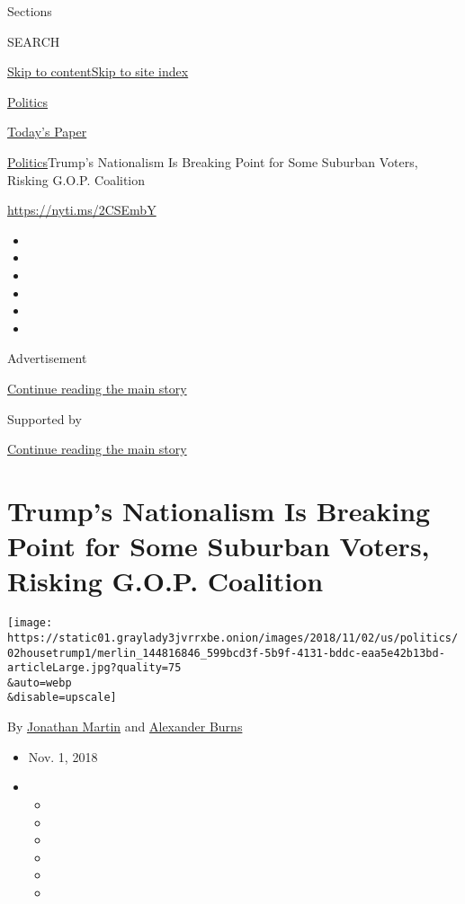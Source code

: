 Sections

SEARCH

\protect\hyperlink{site-content}{Skip to
content}\protect\hyperlink{site-index}{Skip to site index}

\href{https://www.nytimes3xbfgragh.onion/section/politics}{Politics}

\href{https://myaccount.nytimes3xbfgragh.onion/auth/login?response_type=cookie\&client_id=vi}{}

\href{https://www.nytimes3xbfgragh.onion/section/todayspaper}{Today's
Paper}

\href{/section/politics}{Politics}\textbar{}Trump's Nationalism Is
Breaking Point for Some Suburban Voters, Risking G.O.P. Coalition

\url{https://nyti.ms/2CSEmbY}

\begin{itemize}
\item
\item
\item
\item
\item
\item
\end{itemize}

Advertisement

\protect\hyperlink{after-top}{Continue reading the main story}

Supported by

\protect\hyperlink{after-sponsor}{Continue reading the main story}

\hypertarget{trumps-nationalism-is-breaking-point-for-some-suburban-voters-risking-gop-coalition}{%
\section{Trump's Nationalism Is Breaking Point for Some Suburban Voters,
Risking G.O.P.
Coalition}\label{trumps-nationalism-is-breaking-point-for-some-suburban-voters-risking-gop-coalition}}

\texttt{[image: https://static01.graylady3jvrrxbe.onion/images/2018/11/02/us/politics/02housetrump1/merlin\_144816846\_599bcd3f-5b9f-4131-bddc-eaa5e42b13bd-articleLarge.jpg?quality=75\\\&auto=webp\\\&disable=upscale]}

By \href{https://www.nytimes3xbfgragh.onion/by/jonathan-martin}{Jonathan
Martin} and
\href{https://www.nytimes3xbfgragh.onion/by/alexander-burns}{Alexander
Burns}

\begin{itemize}
\item
  Nov. 1, 2018
\item
  \begin{itemize}
  \item
  \item
  \item
  \item
  \item
  \item
  \end{itemize}
\end{itemize}

